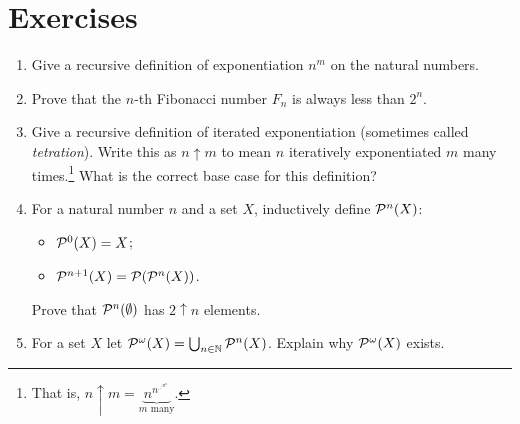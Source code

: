 \documentclass[10pt]{amsart}
\begin{document}

\section*{Exercises}

\begin{enumerate}
\item Give a recursive definition of exponentiation $n^m$ on the natural numbers.
\item Prove that the $n$-th Fibonacci number $F_n$ is always less than $2^n$.
\item Give a recursive definition of iterated exponentiation (sometimes called \emph{tetration}). Write this as $n \uparrow m$ to mean $n$ iteratively exponentiated $m$ many times.\footnote{That is,
$ \displaystyle
n \uparrow m = \underbrace{n^{n^{\iddots^{n^n}}}}_{m \text{ many}}.
$}
What is the correct base case for this definition?
\item For a natural number $n$ and a set $X$, inductively define $\mathcal{P}^n(X)$:
  \begin{itemize}
  \item $\mathcal{P}^0(X) = X$;
  \item $\mathcal{P}^{n+1}(X) = \mathcal{P}(\mathcal{P}^n(X))$.
  \end{itemize}
Prove that $\mathcal{P}^n(\emptyset)$ has $2 \uparrow n$ elements.
\item For a set $X$ let $\mathcal{P}^{\omega}(X) = \bigcup_{n \in \mathbb{N}} \mathcal{P}^n(X)$. Explain why $\mathcal{P}^\omega(X)$ exists. 
\end{enumerate}
\end{document}
